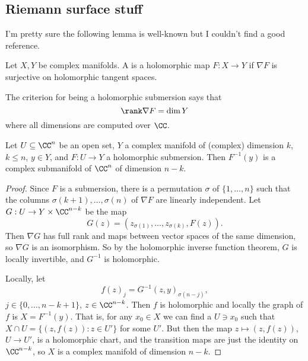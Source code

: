 
\subsection{Riemann surface stuff}
I'm pretty sure the following lemma is well-known but I couldn't find a good reference.
\begin{definition}
Let $X,Y$ be complex manifolds.
A  is a holomorphic map $F: X \to Y$ if $\nabla F$ is surjective on holomorphic tangent spaces.
\end{definition}
The criterion for being a holomorphic submersion says that
$$\rank \nabla F = \dim Y$$
where all dimensions are computed over $\CC$.
\begin{lemma}
Let $U \subseteq \CC^n$ be an open set, $Y$ a complex manifold of (complex) dimension $k$, $k \leq n$, $y \in Y$, and $F: U \to Y$ a holomorphic submersion.
Then $F^{-1}(y)$ is a complex submanifold of $\CC^n$ of dimension $n - k$.
\end{lemma}
\begin{proof}
Since $F$ is a submersion, there is a permutation $\sigma$ of $\{1, \dots, n\}$ such that the columns $\sigma(k+1), \dots, \sigma(n)$ of $\nabla F$ are linearly independent.
Let $G: U \to Y \times \CC^{n - k}$ be the map
$$G(z) = (z_{\sigma(1)}, \dots, z_{\sigma(k)}, F(z)).$$
Then $\nabla G$ has full rank and maps between vector spaces of the same dimension, so $\nabla G$ is an isomorphism.
So by the holomorphic inverse function theorem, $G$ is locally invertible, and $G^{-1}$ is holomorphic.

Locally, let
$$f(z)_j = G^{-1}(z, y)_{\sigma(n-j)},$$
$j \in \{0, \dots, n - k + 1\}$, $z \in \CC^{n - k}$.
Then $f$ is holomorphic and locally the graph of $f$ is $X = F^{-1}(y)$.
That is, for any $x_0 \in X$ we can find a $U \ni x_0$ such that $X \cap U = \{(z, f(z)): z \in U'\}$ for some $U'$.
But then the map $z \mapsto (z, f(z))$, $U \to U'$, is a holomorphic chart, and the transition maps are just the identity on $\CC^{n-k}$, so $X$ is a complex manifold of dimension $n - k$.
\end{proof}


